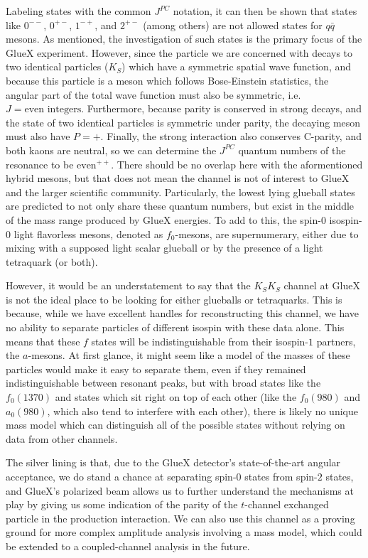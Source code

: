 Labeling states with the common $J^{PC}$ notation, it can then be shown that states like $0^{--}$, $0^{+-}$, $1^{-+}$, and $2^{+-}$ (among others) are not allowed states for $q\bar{q}$ mesons. As mentioned, the investigation of such states is the primary focus of the GlueX experiment. However, since the particle we are concerned with decays to two identical particles ($K_S$) which have a symmetric spatial wave function, and because this particle is a meson which follows Bose-Einstein statistics, the angular part of the total wave function must also be symmetric, i.e. $J = \text{even integers}$. Furthermore, because parity is conserved in strong decays, and the state of two identical particles is symmetric under parity, the decaying meson must also have $P=+$. Finally, the strong interaction also conserves C-parity, and both kaons are neutral, so we can determine the $J^{PC}$ quantum numbers of the resonance to be $\text{even}^{++}$. There should be no overlap here with the aformentioned hybrid mesons, but that does not mean the channel is not of interest to GlueX and the larger scientific community. Particularly, the lowest lying glueball states are predicted to not only share these quantum numbers, but exist in the middle of the mass range produced by GlueX energies\cite{morningstar_glueball_1999}. To add to this, the spin-$0$ isospin-$0$ light flavorless mesons, denoted as $f_0$-mesons, are supernumerary, either due to mixing with a supposed light scalar glueball or by the presence of a light tetraquark (or both)\cite{particle_data_group_review_2020}.

However, it would be an understatement to say that the $K_SK_S$ channel at GlueX is not the ideal place to be looking for either glueballs or tetraquarks. This is because, while we have excellent handles for reconstructing this channel, we have no ability to separate particles of different isospin with these data alone. This means that these $f$ states will be indistinguishable from their isospin-$1$ partners, the $a$-mesons. At first glance, it might seem like a model of the masses of these particles would make it easy to separate them, even if they remained indistinguishable between resonant peaks, but with broad states like the $f_0(1370)$ and states which sit right on top of each other (like the $f_0(980)$ and $a_0(980)$, which also tend to interfere with each other), there is likely no unique mass model which can distinguish all of the possible states without relying on data from other channels.

The silver lining is that, due to the GlueX detector's state-of-the-art angular acceptance\cite{adhikari_gluex_2021}, we do stand a chance at separating spin-$0$ states from spin-$2$ states, and GlueX's polarized beam allows us to further understand the mechanisms at play by giving us some indication of the parity of the $t$-channel exchanged particle in the production interaction. We can also use this channel as a proving ground for more complex amplitude analysis involving a mass model, which could be extended to a coupled-channel analysis in the future.


